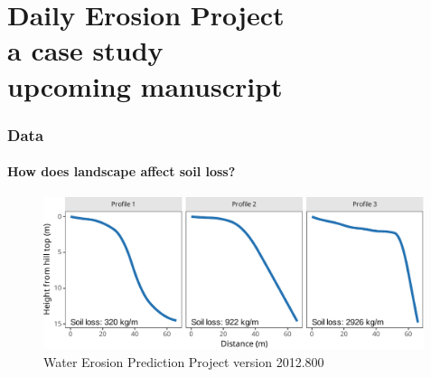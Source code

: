 \documentclass{snedecorbeamer}
\begin{document}
\section{Daily Erosion Project \\ {\small a case study} \\
{\tiny upcoming manuscript}}

\begin{frame}
  \frametitle{Data}
  \framesubtitle{How does landscape affect soil loss?}

  \begin{figure}
    \centering
    \includegraphics[height=12em]{inc/wepp_elevation_profiles}
    \caption*{
          \href{https://www.ars.usda.gov/midwest-area/west-lafayette-in/national-soil-erosion-research/docs/wepp/}{}
      Water Erosion Prediction Project version 2012.800
    }
  \end{figure}

\end{frame}
\end{document}
